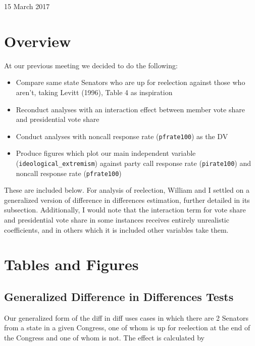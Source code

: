 \documentclass[12pt]{article}
\begin{document}
	
\begin{center}
	\Large 15 March 2017
\end{center}

\section{Overview}

At our previous meeting we decided to do the following:

\begin{itemize}
	\item Compare same state Senators who are up for reelection against those who aren't, taking Levitt (1996), Table 4 as inspiration
	
	\item Reconduct analyses with an interaction effect between member vote share and presidential vote share
	
	\item Conduct analyses with noncall response rate (\verb|pfrate100|) as the DV
	
	\item Produce figures which plot our main independent variable (\verb|ideological_extremism|) against party call response rate (\verb|pirate100|) and noncall response rate (\verb|pfrate100|)
\end{itemize}

\noindent
These are included below. For analysis of reelection, William and I settled on a generalized version of difference in differences estimation, further detailed in its subsection. Additionally, I would note that the interaction term for vote share and presidential vote share in some instances receives entirely unrealistic coefficients, and in others which it is included other variables take them.

\section{Tables and Figures}

\subsection{Generalized Difference in Differences Tests}

Our generalized form of the diff in diff uses cases in which there are 2 Senators from a state in a given Congress, one of whom is up for reelection at the end of the Congress and one of whom is not. The effect is calculated by 
\end{document}
